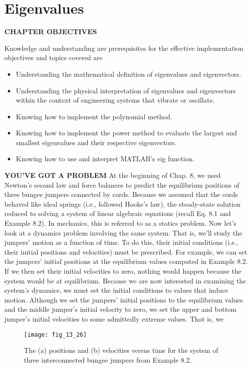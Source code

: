 \documentclass[../main.tex]{subfiles}
\begin{document}
\theoremstyle{definition}

\chapter{Eigenvalues}
\begin{center}
\textbf{CHAPTER OBJECTIVES}
\end{center}
Knowledge and understanding are prerequisites for the effective implementation objectives and topics covered are
\begin{itemize}
\item Understanding the mathematical definition of eigenvalues and eigenvectors.
\item Understanding the physical interpretation of eigenvalues and eigenvectors within
the context of engineering systems that vibrate or oscillate.
\item Knowing how to implement the polynomial method.
\item Knowing how to implement the power method to evaluate the largest and smallest eigenvalues and their respective eigenvectors.
\item Knowing how to use and interpret MATLAB's eig function.
\end{itemize}
\textbf{YOU'VE GOT A PROBLEM }
At the beginning of Chap. 8, we used Newton's second law and force balances to predict the equilibrium positions of three bungee jumpers connected by cords. Because
we assumed that the cords behaved like ideal springs (i.e., followed Hooke's law),
the steady-state solution reduced to solving a system of linear algebraic equations (recall
Eq. 8.1 and Example 8.2). In mechanics, this is referred to as a statics problem.
Now let's look at a dynamics problem involving the same system. That is, we'll study the
jumpers' motion as a function of time. To do this, their initial conditions (i.e., their initial positions and velocities) must be prescribed. For example, we can set the jumpers' initial positions at the equilibrium values computed in Example 8.2. If we then set their initial velocities
to zero, nothing would happen because the system would be at equilibrium.
Because we are now interested in examining the system's dynamics, we must set the
initial conditions to values that induce motion. Although we set the jumpers' initial positions to the equilibrium values and the middle jumper's initial velocity to zero, we set the
upper and bottom jumper's initial velocities to some admittedly extreme values. That is, we

\begin{figure}[H]
		\centering
		\texttt{[image: fig\_13\_26]}
	   \caption{\textsf{The (a) positions and (b) velocities versus time for the system of three interconnected bungee
jumpers from Example 8.2.}}
	   \label{fig:fig_13_26}
\end{figure}
\end{document}
